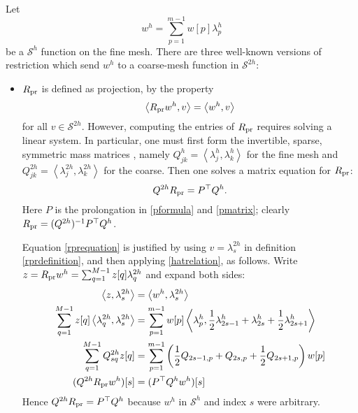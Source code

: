 \documentclass[letterpaper,final,12pt,reqno]{amsart}
\newcommand{\ip}[2]{\left<#1,#2\right>}
\begin{document}
Let
\begin{equation}
  w^h = \sum_{p=1}^{m-1} w[p] \lambda_p^{h} \label{wfine}
\end{equation}
be a $\mathcal{S}^h$ function on the fine mesh.  There are three well-known versions of restriction which send $w^h$ to a coarse-mesh function in $\mathcal{S}^{2h}$:
\begin{itemize}
\item $R_{\text{pr}}$ is defined as projection, by the property
\begin{equation}
  \ip{\Rpr w^h}{v} = \ip{w^h}{v} \label{rprdefinition}
\end{equation}
for all $v\in \mathcal{S}^{2h}$.  However, computing the entries of $R_{\text{pr}}$ requires solving a linear system.  In particular, one must first form the invertible, sparse, symmetric mass matrices \cite{Elmanetal2014}, namely $Q_{jk}^{h} = \ip{\lambda_j^{h}}{\lambda_k^{h}}$ for the fine mesh and $Q_{jk}^{2h} = \ip{\lambda_j^{2h}}{\lambda_k^{2h}}$ for the coarse.  Then one solves a matrix equation for $R_{\text{pr}}$:
\begin{equation}
  Q^{2h} R_{\text{pr}} = P^\top Q^{h}.  \label{rprequation}
\end{equation}
Here $P$ is the prolongation in \eqref{pformula} and \eqref{pmatrix}; clearly $R_{\text{pr}} = (Q^{2h})^{-1} P^\top Q^{h}$.

Equation \eqref{rprequation} is justified by using $v=\lambda_s^{2h}$ in definition \eqref{rprdefinition}, and then applying \eqref{hatrelation}, as follows.  Write $z = R_{\text{pr}} w^h = \sum_{q=1}^{M-1} z[q] \lambda_q^{2h}$ and expand both sides:
\begin{align*}
\ip{z}{\lambda_s^{2h}} &= \ip{w^h}{\lambda_s^{2h}} \\
\sum_{q=1}^{M-1} z[q] \ip{\lambda_q^{2h}}{\lambda_s^{2h}} &= \sum_{p=1}^{m-1} w[p] \ip{\lambda_p^{h}}{\frac{1}{2} \lambda_{2s-1}^{h} + \lambda_{2s}^{h} + \frac{1}{2} \lambda_{2s+1}^{h}} \\
\sum_{q=1}^{M-1} Q_{sq}^{2h} z[q] &= \sum_{p=1}^{m-1} \left(\frac{1}{2} Q_{2s-1,p} + Q_{2s,p} + \frac{1}{2} Q_{2s+1,p}\right) w[p] \\
(Q^{2h} \Rpr w^h)[s] &= (P^\top Q^h w^h)[s]
\end{align*}
Hence $Q^{2h} R_{\text{pr}} = P^\top Q^h$ because $w^h$ in $\mathcal{S}^h$ and index $s$ were arbitrary.


\end{itemize}
\end{document}
